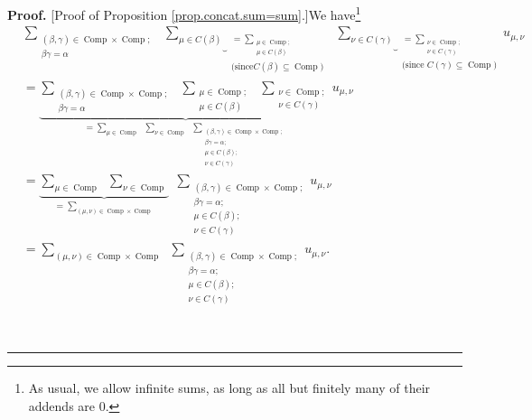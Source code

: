 \documentclass[numbers=enddot,12pt,final,onecolumn,notitlepage]{scrartcl}%
\theoremstyle{definition}
\newenvironment{proof}[1][Proof]{\noindent\textbf{#1.} }{\ \rule{0.5em}{0.5em}}
\let\sumnonlimits\sum
\renewcommand{\sum}{\sumnonlimits\limits}
\begin{document}
\begin{proof}
[Proof of Proposition \ref{prop.concat.sum=sum}.]We have\footnote{As
usual, we allow infinite sums, as long as all but finitely many of their
addends are $0$.}
\begin{align}
&  \sum_{\substack{\left(  \beta,\gamma\right)  \in\operatorname*{Comp}%
\times\operatorname*{Comp};\\\beta\gamma=\alpha}}\ \ \underbrace{\sum_{\mu\in
C\left(  \beta\right)  }}_{\substack{=\sum_{\substack{\mu\in
\operatorname*{Comp};\\\mu\in C\left(  \beta\right)  }}\\\text{(since
}C\left(  \beta\right)  \subseteq\operatorname*{Comp}\text{)}}%
}\ \ \underbrace{\sum_{\nu\in C\left(  \gamma\right)  }}_{\substack{=\sum
_{\substack{\nu\in\operatorname*{Comp};\\\nu\in C\left(  \gamma\right)
}}\\\text{(since }C\left(  \gamma\right)  \subseteq\operatorname*{Comp}%
\text{)}}}u_{\mu,\nu}\nonumber\\
&  =\underbrace{\sum_{\substack{\left(  \beta,\gamma\right)  \in
\operatorname*{Comp}\times\operatorname*{Comp};\\\beta\gamma=\alpha}%
}\ \ \sum_{\substack{\mu\in\operatorname*{Comp};\\\mu\in C\left(
\beta\right)  }}\ \ \sum_{\substack{\nu\in\operatorname*{Comp};\\\nu\in
C\left(  \gamma\right)  }}}_{=\sum_{\mu\in\operatorname*{Comp}}\ \ \sum
_{\nu\in\operatorname*{Comp}}\ \ \sum_{\substack{\left(  \beta,\gamma\right)
\in\operatorname*{Comp}\times\operatorname*{Comp};\\\beta\gamma=\alpha
;\\\mu\in C\left(  \beta\right)  ;\\\nu\in C\left(  \gamma\right)  }}}%
u_{\mu,\nu}\nonumber\\
&  =\underbrace{\sum_{\mu\in\operatorname*{Comp}}\ \ \sum_{\nu\in
\operatorname*{Comp}}}_{=\sum_{\left(  \mu,\nu\right)  \in\operatorname*{Comp}%
\times\operatorname*{Comp}}}\ \ \sum_{\substack{\left(  \beta,\gamma\right)
\in\operatorname*{Comp}\times\operatorname*{Comp};\\\beta\gamma=\alpha
;\\\mu\in C\left(  \beta\right)  ;\\\nu\in C\left(  \gamma\right)  }%
}u_{\mu,\nu}\nonumber\\
&  =\sum_{\left(  \mu,\nu\right)  \in\operatorname*{Comp}\times
\operatorname*{Comp}}\ \ \sum_{\substack{\left(  \beta,\gamma\right)
\in\operatorname*{Comp}\times\operatorname*{Comp};\\\beta\gamma=\alpha
;\\\mu\in C\left(  \beta\right)  ;\\\nu\in C\left(  \gamma\right)  }%
}u_{\mu,\nu}. \label{pf.prop.concat.sum=sum.1}%
\end{align}



\end{proof}
\end{document}

